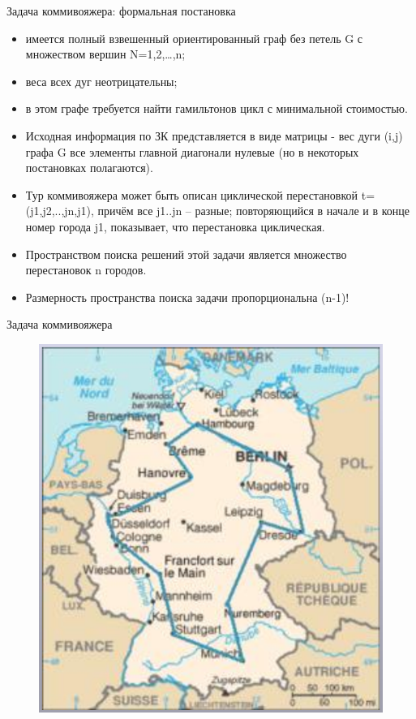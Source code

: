 \documentclass{beamer}
\begin{document}
\begin{frame}{Задача коммивояжера: формальная постановка}
\begin{itemize}
\item имеется полный взвешенный ориентированный граф без петель G с множеством вершин N={1,2,…,n};
\item веса всех дуг неотрицательны;
\item в этом графе требуется найти гамильтонов цикл с минимальной стоимостью.
\item Исходная информация по ЗК представляется в виде
матрицы - вес дуги (i,j) графа G все элементы главной
диагонали нулевые (но в некоторых постановках полагаются).
\item Тур коммивояжера может быть описан циклической
перестановкой t=(j1,j2,..,jn,j1), причём все j1..jn – разные;
повторяющийся в начале и в конце номер города j1,
показывает, что перестановка циклическая.
\item Пространством поиска решений этой задачи является множество перестановок n городов.
\item Размерность пространства поиска задачи пропорциональна (n-1)!
\end{itemize}
\end{frame}

\begin{frame}{Задача коммивояжера}
\begin{figure}[h]
\centering
\includegraphics[scale=0.4]{images/lec04-pic37.png}
\end{figure}
\end{frame}
\end{document}
